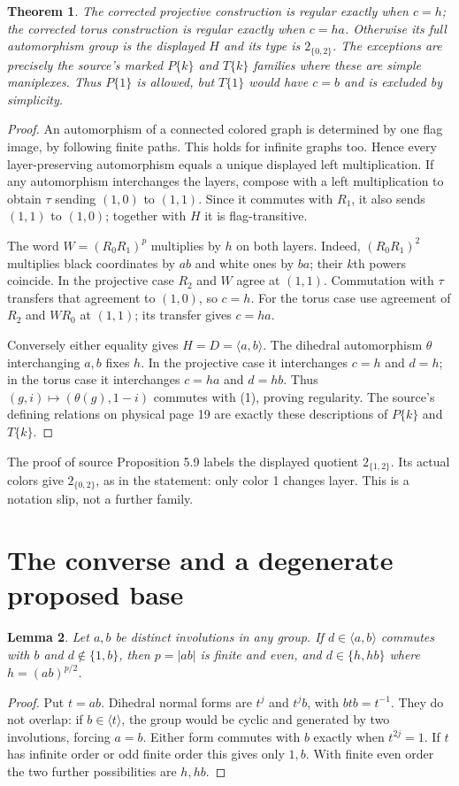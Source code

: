 \documentclass[a4paper,11pt]{article}
\newtheorem{theorem}{Theorem}\newtheorem{lemma}[theorem]{Lemma}
\begin{document}
\begin{theorem}\label{regularity}
The corrected projective construction is regular exactly when $c=h$;
the corrected torus construction is regular exactly when $c=ha$.
Otherwise its full automorphism group is the displayed $H$ and its type is
$2_{\{0,2\}}$. The exceptions are precisely the source's marked $P\{k\}$
and $T\{k\}$ families where these are simple maniplexes. Thus $P\{1\}$
is allowed, but $T\{1\}$ would have $c=b$ and is excluded by simplicity.
\end{theorem}
\begin{proof}
An automorphism of a connected colored graph is determined by one flag image,
by following finite paths. This holds for infinite graphs too. Hence every
layer-preserving automorphism equals a unique displayed left multiplication.
If any automorphism interchanges the layers, compose with a left multiplication
to obtain $\tau$ sending $(1,0)$ to $(1,1)$. Since it commutes with $R_1$,
it also sends $(1,1)$ to $(1,0)$; together with $H$ it is flag-transitive.

The word $W=(R_0R_1)^p$ multiplies by $h$ on both layers. Indeed,
$(R_0R_1)^2$ multiplies black coordinates by $ab$ and white ones by $ba$;
their $k$th powers coincide. In the projective case $R_2$ and $W$ agree at
$(1,1)$. Commutation with $\tau$ transfers that agreement to $(1,0)$, so
$c=h$. For the torus case use agreement of $R_2$ and $WR_0$ at $(1,1)$;
its transfer gives $c=ha$.

Conversely either equality gives $H=D=\langle a,b\rangle$. The dihedral
automorphism $\theta$ interchanging $a,b$ fixes $h$. In the projective case
it interchanges $c=h$ and $d=h$; in the torus case it interchanges $c=ha$
and $d=hb$. Thus $(g,i)\mapsto(\theta(g),1-i)$ commutes with (1), proving
regularity. The source's defining relations on physical page 19 are exactly
these descriptions of $P\{k\}$ and $T\{k\}$.
\end{proof}

The proof of source Proposition 5.9 labels the displayed quotient
$2_{\{1,2\}}$. Its actual colors give $2_{\{0,2\}}$, as in the statement:
only color 1 changes layer. This is a notation slip, not a further family.

\section{The converse and a degenerate proposed base}
\begin{lemma}\label{dihedral}
Let $a,b$ be distinct involutions in any group. If
$d\in\langle a,b\rangle$ commutes with $b$ and $d\notin\{1,b\}$, then
$p=|ab|$ is finite and even, and
$d\in\{h,hb\}$ where $h=(ab)^{p/2}$.
\end{lemma}
\begin{proof}
Put $t=ab$. Dihedral normal forms are $t^j$ and $t^jb$, with
$btb=t^{-1}$. They do not overlap: if $b\in\langle t\rangle$, the group
would be cyclic and generated by two involutions, forcing $a=b$.
Either form commutes with $b$ exactly when $t^{2j}=1$. If $t$ has infinite
order or odd finite order this gives only $1,b$. With finite even order the
two further possibilities are $h,hb$.
\end{proof}
\end{document}
